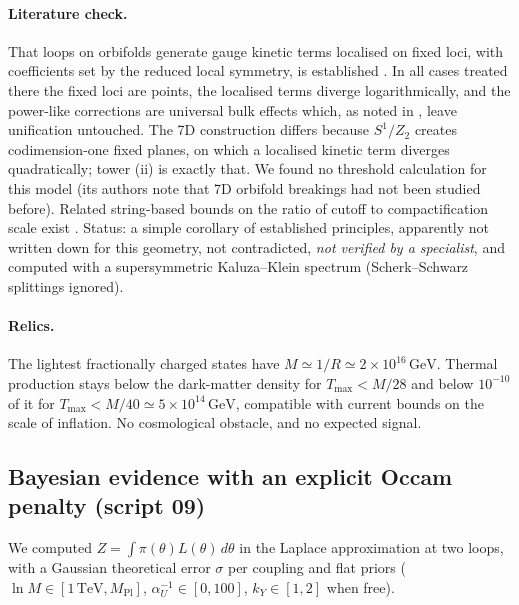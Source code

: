 \documentclass[11pt,a4paper]{article}
\newcommand{\ainv}{\alpha^{-1}}
\newcommand{\kY}{k_Y}
\newcommand{\GeV}{\,\mathrm{GeV}}
\newcommand{\TeV}{\,\mathrm{TeV}}
\newcommand{\MPl}{M_{\mathrm{Pl}}}
\begin{document}
\paragraph{Literature check.} That loops on orbifolds generate gauge kinetic terms localised on fixed loci, with coefficients set by
the reduced local symmetry, is established \cite{GNH1,GNH2,GLS,Lee6D}. In all cases treated there the fixed loci are points, the
localised terms diverge logarithmically, and the power-like corrections are universal bulk effects which, as noted in \cite{Lee6D}, leave unification untouched. The 7D construction differs because $S^1/Z_2$ creates codimension-one fixed planes, on which a localised
kinetic term diverges quadratically; tower (ii) is exactly that. We found no threshold calculation for this model
(its authors note that 7D orbifold breakings had not been studied before). Related string-based bounds on the ratio of cutoff to
compactification scale exist \cite{HT}. Status: a simple corollary of established principles, apparently not written down for this
geometry, not contradicted, \emph{not verified by a specialist}, and computed with a supersymmetric Kaluza--Klein spectrum
(Scherk--Schwarz splittings ignored).

\paragraph{Relics.} The lightest fractionally charged states have $M\simeq1/R\simeq2\times10^{16}\GeV$. Thermal production stays below
the dark-matter density for $T_{\max}<M/28$ and below $10^{-10}$ of it for $T_{\max}<M/40\simeq5\times10^{14}\GeV$, compatible with
current bounds on the scale of inflation. No cosmological obstacle, and no expected signal.

\subsection{Bayesian evidence with an explicit Occam penalty (script 09)}
We computed $Z=\int\pi(\theta)L(\theta)\,d\theta$ in the Laplace approximation at two loops, with a Gaussian theoretical error
$\sigma$ per coupling and flat priors ($\ln M\in[1\TeV,\MPl]$, $\ainv_U\in[0,100]$, $\kY\in[1,2]$ when free).
\end{document}
